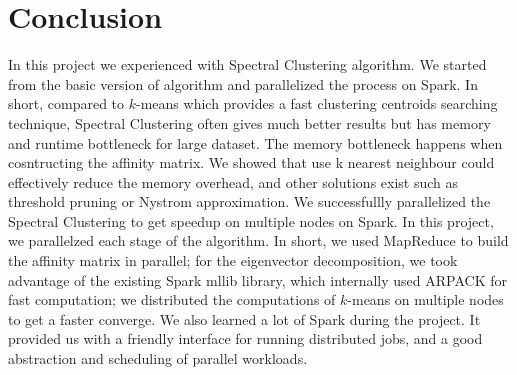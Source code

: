 \documentclass{acm_proc_article-sp}
\begin{document}
\section{Conclusion}
In this project we experienced with Spectral Clustering algorithm. We started from the basic version of algorithm and parallelized the process on Spark. In short, compared to $k$-means which provides a fast clustering centroids searching technique, Spectral Clustering often gives much better results but has memory and runtime bottleneck for large dataset. The memory bottleneck happens when cosntructing the affinity matrix. We showed that use k nearest neighbour could effectively reduce the memory overhead, and other solutions exist such as threshold pruning or Nystrom approximation. We successfullly parallelized the Spectral Clustering to get speedup on multiple nodes on Spark. In this project, we parallelzed each stage of the algorithm. In short, we used MapReduce to build the affinity matrix in parallel; for the eigenvector decomposition, we took advantage of the existing Spark mllib library, which internally used ARPACK for fast computation; we distributed the computations of $k$-means on multiple nodes to get a faster converge. We also learned a lot of Spark during the project. It provided us with a friendly interface for running distributed jobs, and a good abstraction and scheduling of parallel workloads.


%
%

\balancecolumns
\end{document}
